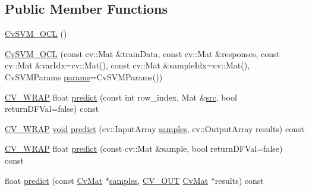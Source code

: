 \subsection*{Public Member Functions}
\begin{DoxyCompactItemize}
\item 
\hyperlink{classcv_1_1ocl_1_1CvSVM__OCL_abc2f9c3478f6ebb16a85309442f2ba29}{Cv\-S\-V\-M\-\_\-\-O\-C\-L} ()
\item 
\hyperlink{classcv_1_1ocl_1_1CvSVM__OCL_a29fd946f49a715e173a4778471839087}{Cv\-S\-V\-M\-\_\-\-O\-C\-L} (const cv\-::\-Mat \&train\-Data, const cv\-::\-Mat \&responses, const cv\-::\-Mat \&var\-Idx=cv\-::\-Mat(), const cv\-::\-Mat \&sample\-Idx=cv\-::\-Mat(), Cv\-S\-V\-M\-Params \hyperlink{compat_8hpp_a0480a03ecc41b20cde376602531d9270}{params}=Cv\-S\-V\-M\-Params())
\item 
\hyperlink{core_2types__c_8h_ae435babf3ce7cca990524b23adf6b4a3}{C\-V\-\_\-\-W\-R\-A\-P} float \hyperlink{classcv_1_1ocl_1_1CvSVM__OCL_a82dffabc246dfddca6d1ff54c884b447}{predict} (const int row\-\_\-index, Mat \&\hyperlink{legacy_8hpp_a371cd109b74033bc4366f584edd3dacc}{src}, bool return\-D\-F\-Val=false) const 
\item 
\hyperlink{core_2types__c_8h_ae435babf3ce7cca990524b23adf6b4a3}{C\-V\-\_\-\-W\-R\-A\-P} \hyperlink{legacy_8hpp_a8bb47f092d473522721002c86c13b94e}{void} \hyperlink{classcv_1_1ocl_1_1CvSVM__OCL_a0e7c10b7d6b376e5e12a77cf6a48ae3c}{predict} (cv\-::\-Input\-Array \hyperlink{legacy_8hpp_a4fd80ec44eadba9c1fc910f5132046b6}{samples}, cv\-::\-Output\-Array results) const 
\item 
\hyperlink{core_2types__c_8h_ae435babf3ce7cca990524b23adf6b4a3}{C\-V\-\_\-\-W\-R\-A\-P} float \hyperlink{classcv_1_1ocl_1_1CvSVM__OCL_a2b476695fa02a882b0679b95faf646fd}{predict} (const cv\-::\-Mat \&sample, bool return\-D\-F\-Val=false) const 
\item 
float \hyperlink{classcv_1_1ocl_1_1CvSVM__OCL_a928f7e27515babcdb05e4e92e24e0149}{predict} (const \hyperlink{structCvMat}{Cv\-Mat} $\ast$\hyperlink{legacy_8hpp_a4fd80ec44eadba9c1fc910f5132046b6}{samples}, \hyperlink{core_2types__c_8h_a4e999bc21cb894d3ed789f3f0bc26778}{C\-V\-\_\-\-O\-U\-T} \hyperlink{structCvMat}{Cv\-Mat} $\ast$results) const 
\end{DoxyCompactItemize}

